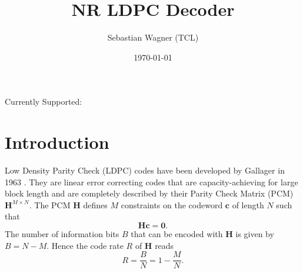 \documentclass{article}
\title{NR LDPC Decoder}
\author{Sebastian Wagner (TCL)}
\date{\today}
\def\0{\mathbf{0}}
\def\c{\mathbf{c}}
\def\H{\mathbf{H}}
\begin{document}
\maketitle



\begin{center}Currently Supported:\end{center}

\tableofcontents

\newpage
\section{Introduction}
\label{sec:introduction}

Low Density Parity Check (LDPC) codes have been developed by Gallager in 1963 \cite{gallager1962low}. They are linear error correcting codes that are capacity-achieving for large block length and are completely described by their Parity Check Matrix (PCM) $\H^{M\times N}$. The PCM $\H$ defines $M$ constraints on the codeword $\c$ of length $N$ such that
\begin{equation}
  \label{eq:29}
  \H\c = \0.
\end{equation}
The number of information bits $B$ that can be encoded with $\H$ is given by $B=N-M$. Hence the code rate $R$ of $\H$ reads
\begin{equation}
  \label{eq:37}
  R = \frac{B}{N} = 1-\frac{M}{N}.
\end{equation}
\end{document}
